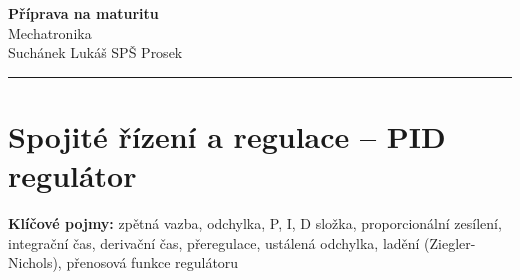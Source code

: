 \documentclass[a4paper,10pt]{article}
\begin{document}
\begin{minipage}[t]{0.75\textwidth}
    {\Huge\bfseries\color{accent} Příprava na maturitu}\\[4pt]
    {\large\color{stripeblue} Mechatronika}\\[2pt]
    \textcolor{medgray}{\small Suchánek Lukáš \quad SPŠ Prosek }
\end{minipage}
\hfill
\begin{minipage}[t]{0.22\textwidth}
    \raggedleft
\end{minipage}

\vspace{6pt}
\noindent\color{accent}\rule{\linewidth}{1.5pt}
\vspace{2pt}

\section{Spojité řízení a regulace -- PID regulátor}

\begin{pojmybox}
\textbf{Klíčové pojmy:}
zpětná vazba, odchylka, P, I, D složka, proporcionální zesílení,
integrační čas, derivační čas, přeregulace, ustálená odchylka,
ladění (Ziegler-Nichols), přenosová funkce regulátoru
\end{pojmybox}
\end{document}
